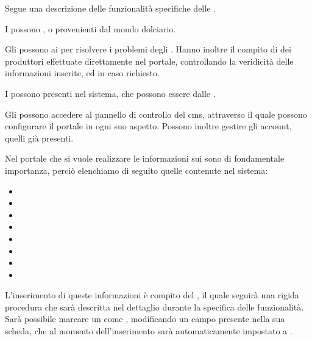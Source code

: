 \bigskip
\noindent
Segue una descrizione delle funzionalità specifiche delle .

I  possono ,  o   provenienti dal mondo dolciario.

Gli  possono  ai  per risolvere i problemi degli . Hanno inoltre il compito di  dei produttori effettuate direttamente nel portale, controllando la veridicità delle informazioni inserite, ed in caso  richiesto.

I  possono  presenti nel sistema, che possono essere  dalle .

Gli  possono accedere al pannello di controllo del \gls{cms}, attraverso il quale possono configurare il portale in ogni suo aspetto. Possono inoltre gestire gli account,  quelli già presenti. 

\bigskip
\noindent
Nel portale che si vuole realizzare le informazioni sui  sono di fondamentale importanza, perciò elenchiamo di seguito quelle contenute nel sistema:
\begin{itemize}
	\item {}
	\item {}
	\item {}
	\item {}
	\item {}
	\item {}
	\item {}
	\item {}
\end{itemize}
L'inserimento di queste informazioni è compito del , il quale seguirà una rigida procedura che sarà descritta nel dettaglio durante la specifica delle funzionalità.
Sarà possibile marcare un  come , modificando un campo presente nella sua scheda, che al momento dell'inserimento sarà automaticamente impostato a .


